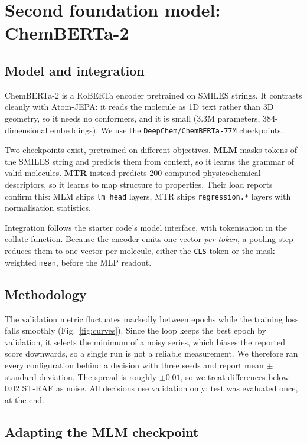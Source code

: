 \documentclass[10pt,twocolumn,a4paper]{article}
\begin{document}
\section{Second foundation model: ChemBERTa-2}

\subsection{Model and integration}

ChemBERTa-2 is a RoBERTa encoder pretrained on SMILES strings. It
contrasts cleanly with Atom-JEPA: it reads the molecule as 1D text
rather than 3D geometry, so it needs no conformers, and it is small
(3.3M parameters, 384-dimensional embeddings). We use the
\texttt{DeepChem/ChemBERTa-77M} checkpoints.

Two checkpoints exist, pretrained on different objectives. \textbf{MLM}
masks tokens of the SMILES string and predicts them from context, so it
learns the grammar of valid molecules. \textbf{MTR} instead predicts 200
computed physicochemical descriptors, so it learns to map structure to
properties. Their load reports confirm this: MLM ships
\texttt{lm\_head} layers, MTR ships \texttt{regression.*} layers with
normalisation statistics.

Integration follows the starter code's model interface, with
tokenisation in the collate function. Because the encoder emits one
vector \emph{per token}, a pooling step reduces them to one vector per
molecule, either the \texttt{CLS} token or the mask-weighted
\texttt{mean}, before the MLP readout.

\subsection{Methodology}

The validation metric fluctuates markedly between epochs while the
training loss falls smoothly (Fig.~\ref{fig:curves}). Since the loop
keeps the best epoch by validation, it selects the minimum of a noisy
series, which biases the reported score downwards, so a single run is
not a reliable measurement. We therefore ran every configuration behind
a decision with three seeds and report mean $\pm$ standard deviation.
The spread is roughly $\pm 0.01$, so we treat differences below $0.02$
ST-RAE as noise. All decisions use validation only; test was evaluated
once, at the end.

\subsection{Adapting the MLM checkpoint}
\end{document}
